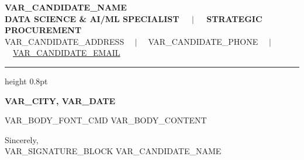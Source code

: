 \documentclass[11pt,a4paper]{article}
\begin{document}
\begin{center}
    {\fontsize{18}{22}\selectfont \bfseries VAR_CANDIDATE_NAME}\\[0.15cm]
    {\fontsize{9.5}{12}\selectfont \textbf{DATA SCIENCE \& AI/ML SPECIALIST \ \ $|$ \ \ STRATEGIC PROCUREMENT}}\\[0.2cm]
    {\fontsize{9}{11}\selectfont VAR_CANDIDATE_ADDRESS \ \ $|$ \ \ VAR_CANDIDATE_PHONE \ \ $|$ \ \ \href{mailto:VAR_CANDIDATE_EMAIL}{VAR_CANDIDATE_EMAIL}}
\end{center}

\vspace{0.15cm}
\hrule height 0.8pt
\vspace{VAR_TOP_SPACE}

{\fontsize{12}{14}\selectfont \hfill \textbf{VAR_CITY, VAR_DATE}}

\vspace{VAR_SUBJECT_SPACE}


\vspace{VAR_BODY_SPACE}

VAR_BODY_FONT_CMD
VAR_BODY_CONTENT

Sincerely,\\[0.15cm]
VAR_SIGNATURE_BLOCK
\noindent VAR_CANDIDATE_NAME
\end{document}
